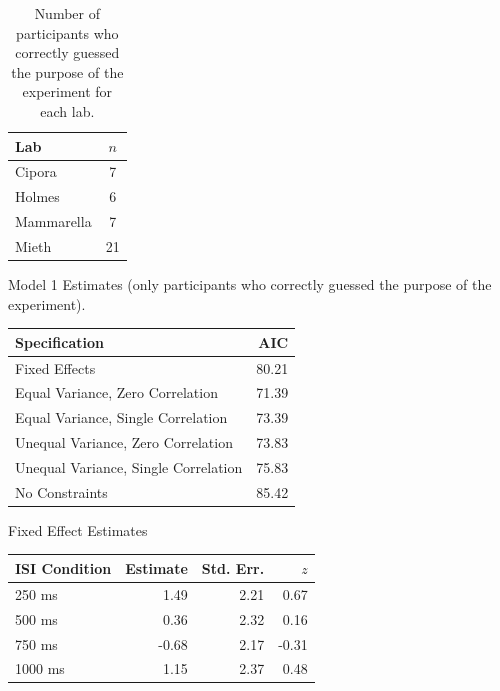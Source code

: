 \documentclass[A4paper,man,floatsintext]{apa6}
\theoremstyle{definition}
\theoremstyle{definition}
\theoremstyle{definition}
\theoremstyle{remark}
\begin{document}
\begin{appendix}
\begin{table}

\caption{\label{tab:mod1bn}Number of participants who correctly guessed the purpose of the experiment for each lab.}
\centering
\begin{tabular}[t]{lc}
\toprule
Lab & $n$\\
\midrule
Cipora & 7\\
Holmes & 6\\
Mammarella & 7\\
Mieth & 21\\
\bottomrule
\end{tabular}
\end{table}

\begin{table}[!p]
\caption{\label{tab:mod1b}Model 1 Estimates (only participants who correctly guessed the purpose of the experiment).}
\begin{subtable}{\textwidth}
\centering
\begin{table}[H]\centering\begingroup\fontsize{10}{12}\selectfont

\begin{tabular}{lr}
\toprule
Specification & AIC\\
\midrule
Fixed Effects & 80.21\\
Equal Variance, Zero Correlation & 71.39\\
Equal Variance, Single Correlation & 73.39\\
Unequal Variance, Zero Correlation & 73.83\\
Unequal Variance, Single Correlation & 75.83\\
No Constraints & 85.42\\
\bottomrule
\end{tabular}\endgroup{}
\end{table}
\end{subtable}
\begin{subtable}{\textwidth}
\caption{Fixed Effect Estimates}
\centering
\begin{table}[H]\centering\begingroup\fontsize{10}{12}\selectfont

\begin{tabular}{lrrr}
\toprule
ISI Condition & Estimate & Std. Err. & $z$\\
\midrule
250  ms & 1.49 & 2.21 & 0.67\\
500  ms & 0.36 & 2.32 & 0.16\\
750  ms & -0.68 & 2.17 & -0.31\\
1000 ms & 1.15 & 2.37 & 0.48\\
\bottomrule
\end{tabular}\endgroup{}
\end{table}
\end{subtable}
\begin{subtable}{\textwidth}
\caption{Variance Component Estimates. Estimates are presented on the standard deviation scale. }
\centering
\begin{table}[H]\centering\begingroup\fontsize{10}{12}\selectfont


\end{table}
\end{subtable}
\end{table}
\end{appendix}
\end{document}

